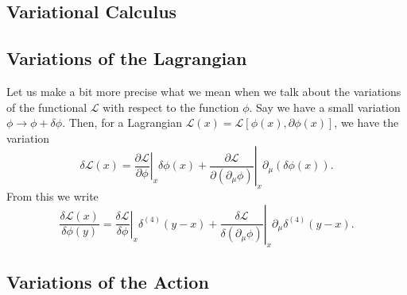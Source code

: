 
\begin{appendices}
  
\chapter{Variational Calculus}%
\label{apx:variational_calculus}

\section{Variations of the Lagrangian}%
\label{sec:variations_of_the_lagrangian}

Let us make a bit more precise what we mean when we talk about the variations of the functional $\mathscr{L}$ with respect to the function $\phi$.  Say we have a small variation $\phi \to \phi + \delta \phi$.  Then, for a Lagrangian $\mathscr{L}(x) = \mathscr{L}[\phi(x), \partial \phi(x)]$, we have the variation
\begin{equation}
  \delta \mathscr{L}(x) = \left.\frac{\partial \mathscr{L}}{\partial \phi}\right\rvert_x \delta \phi(x) + \left. \frac{\partial \mathscr{L}}{\partial (\partial_{\mu} \phi)} \right\rvert_{x} \partial_{\mu} (\delta \phi(x)).
  \label{eq:19-star}
\end{equation}
From this we write
\begin{equation}
  \frac{\delta \mathscr{L}(x)}{\delta \phi(y)} = \left. \frac{\delta \mathscr{L}}{\delta \phi} \right\rvert_{x} \delta^{(4)} (y - x) + \left. \frac{\delta \mathscr{L}}{\delta (\partial _{\mu} \phi)} \right\rvert_{x} \partial_{\mu} \delta^{(4)} (y - x).
\end{equation}

\section{Variations of the Action}%
\label{sec:variations_of_the_action}


\end{appendices}
